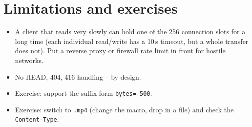 \documentclass[11pt]{article}
\begin{document}
\section{Limitations and exercises}
\begin{itemize}
\item A client that reads very slowly can hold one of the 256 connection slots for a long time (each individual read/write has a 10\,s timeout, but a whole transfer does not). Put a reverse proxy or firewall rate limit in front for hostile networks.
\item No HEAD, 404, 416 handling -- by design.
\item Exercise: support the suffix form \texttt{bytes=-500}.
\item Exercise: switch to \texttt{.mp4} (change the macro, drop in a file) and check the \texttt{Content-Type}.
\end{itemize}
\end{document}
